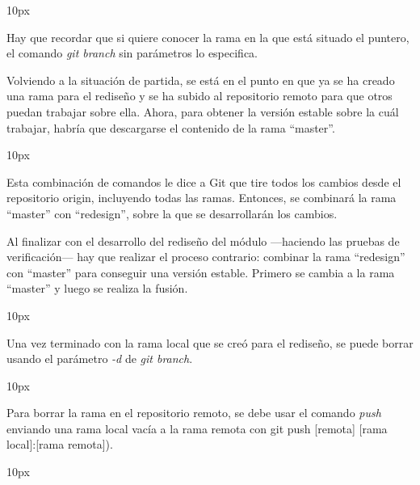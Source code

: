 \begin{center}{
	\fboxsep 10px
	}
\end{center}

Hay que recordar que si quiere conocer la rama en la que está situado el puntero, el comando {\it git branch} sin parámetros lo especifica.

Volviendo a la situación de partida, se está en el punto en que ya se ha creado una rama para el rediseño y se ha subido al repositorio remoto para que otros puedan trabajar sobre ella. Ahora, para obtener la versión estable sobre la cuál trabajar, habría que descargarse el contenido de la rama ``master''.

\begin{center}{
	\fboxsep 10px
	}
\end{center}

Esta combinación de comandos le dice a Git que tire todos los cambios desde el repositorio origin, incluyendo todas las ramas. Entonces, se combinará la rama ``master'' con ``redesign'', sobre la que se desarrollarán los cambios.

Al finalizar con el desarrollo del rediseño del módulo ---haciendo las pruebas de verificación--- hay que realizar el proceso contrario: combinar la rama ``redesign'' con ``master'' para conseguir una versión estable. Primero se cambia a la rama ``master'' y luego se realiza la fusión.

\begin{center}{
	\fboxsep 10px
	}
\end{center}

Una vez terminado con la rama local que se creó para el rediseño, se puede borrar usando el parámetro {\it -d} de {\it git branch}.

\begin{center}{
	\fboxsep 10px
	}
\end{center}

Para borrar la rama en el repositorio remoto, se debe usar el comando {\it push} enviando una rama local vacía a la rama remota con {git push [remota] [rama local]:[rama remota]}).

\begin{center}{
	\fboxsep 10px
	}
\end{center}

%
%